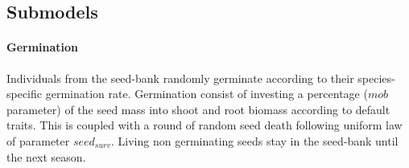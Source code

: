 \subsection{Submodels}\label{subsection:submodels}

\paragraph{Germination} Individuals from the seed-bank randomly germinate according to their species-specific germination rate. Germination consist of investing a percentage ($mob$ parameter) of the seed mass into shoot and root biomass according to default traits. This is coupled with a round of random seed death following uniform law of parameter $seed_{surv}$. Living non germinating seeds stay in the seed-bank until the next season.\\
%
%
% 
%
%


